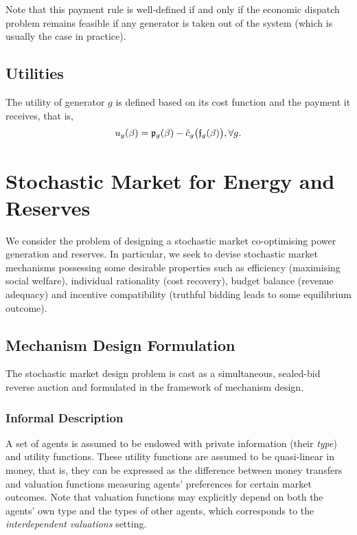 \documentclass{article}
\begin{document}
Note that this payment rule is well-defined if and only if the economic dispatch problem remains feasible if any generator is taken out of the system (which is usually the case in practice).

\subsection{Utilities}

The utility of generator $g$ is defined based on its cost function and the payment it receives, that is,
\begin{equation}
u_g(\beta) = \mathfrak{p}_g(\beta) - \hat{c}_g\big(\frak{f}_g(\beta)\big), \forall g.
\end{equation}

\section{Stochastic Market for Energy and Reserves}


We consider the problem of designing a stochastic market co-optimising power generation and reserves. In particular, we seek to devise stochastic market mechanisms possessing some desirable properties such as efficiency (maximising social welfare), individual rationality (cost recovery), budget balance (revenue adequacy) and incentive compatibility (truthful bidding leads to some equilibrium outcome).

\subsection{Mechanism Design Formulation}

The stochastic market design problem is cast as a simultaneous, sealed-bid reverse auction and formulated in the framework of mechanism design. 

\subsubsection{Informal Description}

A set of agents is assumed to be endowed with private information (their \textit{type}) and utility functions. These utility functions are assumed to be quasi-linear in money, that is, they can be expressed as the difference between money transfers and valuation functions measuring agents' preferences for certain market outcomes. Note that valuation functions may explicitly depend on both the agents' own type and the types of other agents, which corresponds to the \textit{interdependent valuations} setting.
\end{document}
